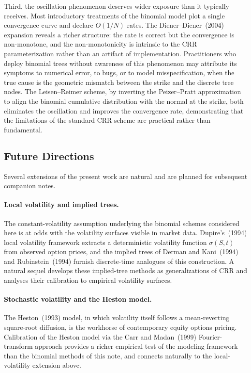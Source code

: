 \documentclass[11pt,a4paper]{article}
\theoremstyle{plain}
\theoremstyle{definition}
\begin{document}
Third, the oscillation phenomenon deserves wider exposure than it
typically receives. Most introductory treatments of the binomial model
plot a single convergence curve and declare $O(1/N)$ rates. The
Diener--Diener~(2004) expansion reveals a richer structure: the rate
is correct but the convergence is non-monotone, and the non-monotonicity
is intrinsic to the CRR parameterization rather than an artifact of
implementation. Practitioners who deploy binomial trees without
awareness of this phenomenon may attribute its symptoms to numerical
error, to bugs, or to model misspecification, when the true cause is
the geometric mismatch between the strike and the discrete tree
nodes. The Leisen--Reimer scheme, by inverting the Peizer--Pratt
approximation to align the binomial cumulative distribution with the
normal at the strike, both eliminates the oscillation and improves the
convergence rate, demonstrating that the limitations of the standard
CRR scheme are practical rather than fundamental.

\subsection*{Future Directions}

Several extensions of the present work are natural and are planned for
subsequent companion notes.

\paragraph{Local volatility and implied trees.} The constant-volatility
assumption underlying the binomial schemes considered here is at odds
with the volatility surfaces visible in market data. Dupire's~(1994)
local volatility framework extracts a deterministic volatility
function $\sigma(S, t)$ from observed option prices, and the
implied trees of Derman and Kani~(1994) and Rubinstein~(1994) furnish
discrete-time analogues of this construction. A natural sequel
develops these implied-tree methods as generalizations of CRR and
analyses their calibration to empirical volatility surfaces.

\paragraph{Stochastic volatility and the Heston model.} The Heston~(1993)
model, in which volatility itself follows a mean-reverting square-root
diffusion, is the workhorse of contemporary equity options pricing.
Calibration of the Heston model via the Carr and
Madan~(1999) Fourier-transform approach provides a richer empirical
test of the modeling framework than the binomial methods of this note,
and connects naturally to the local-volatility extension above.
\end{document}
